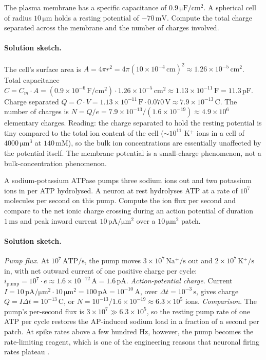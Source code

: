 \begin{exercise}
The plasma membrane has a specific capacitance of $0.9\,\si{\micro\farad}/
\text{cm}^2$. A spherical cell of radius $10\,\si{\micro\meter}$
holds a resting potential of $-70\,\text{mV}$. Compute the total
charge separated across the membrane and the number of charges
involved.
\end{exercise}

\paragraph{Solution sketch.}
The cell's surface area is
$A = 4\pi r^2 = 4\pi (10 \times 10^{-4}\,\text{cm})^2
\approx 1.26 \times 10^{-5}\,\text{cm}^2$.
Total capacitance
$C = C_m \cdot A = (0.9 \times 10^{-6}\,\text{F}/\text{cm}^2)
\cdot 1.26 \times 10^{-5}\,\text{cm}^2
\approx 1.13 \times 10^{-11}\,\text{F} = 11.3\,\text{pF}$.
Charge separated $Q = C \cdot V
= 1.13 \times 10^{-11}\,\text{F} \cdot 0.070\,\text{V}
\approx 7.9 \times 10^{-13}\,\text{C}$. The number of charges is
$N = Q/e = 7.9 \times 10^{-13} / (1.6 \times 10^{-19})
\approx 4.9 \times 10^6$ elementary charges. Reading: the charge
separated to hold the resting potential is tiny compared to the
total ion content of the cell ($\sim 10^{11}$ K$^+$ ions in a
cell of $4000\,\si{\micro\meter}^3$ at $140\,\text{mM}$), so the bulk
ion concentrations are essentially unaffected by the potential
itself. The membrane potential is a small-charge phenomenon, not a
bulk-concentration phenomenon.

\begin{exercise}
A sodium-potassium ATPase pumps three sodium ions out and two
potassium ions in per ATP hydrolysed. A neuron at rest hydrolyses
ATP at a rate of $10^7$ molecules per second on this pump. Compute
the ion flux per second and compare to the net ionic charge
crossing during an action potential of duration $1\,\text{ms}$ and
peak inward current $10\,\text{pA}/\si{\micro\meter}^2$ over a
$10\,\si{\micro\meter}^2$ patch.
\end{exercise}

\paragraph{Solution sketch.}
\emph{Pump flux.} At $10^7\,\text{ATP/s}$, the pump moves
$3 \times 10^7\,\text{Na$^+$/s}$ out and $2 \times 10^7\,\text{K$^+$/s}$
in, with net outward current of one positive charge per cycle:
$i_{\text{pump}} = 10^7 \cdot e
\approx 1.6 \times 10^{-12}\,\text{A} = 1.6\,\text{pA}$.
\emph{Action-potential charge.} Current
$I = 10\,\text{pA}/\si{\micro\meter}^2 \cdot 10\,\si{\micro\meter}^2
= 100\,\text{pA} = 10^{-10}\,\text{A}$, over $\Delta t = 10^{-3}\,\text{s}$,
gives charge $Q = I \Delta t = 10^{-13}\,\text{C}$, or
$N = 10^{-13}/1.6 \times 10^{-19} \approx 6.3 \times 10^5$ ions.
\emph{Comparison.} The pump's per-second flux is
$3 \times 10^7 \gg 6.3 \times 10^5$, so the resting pump rate of one
ATP per cycle restores the AP-induced sodium load in a fraction of a
second per patch. At spike rates above a few hundred Hz, however, the
pump becomes the rate-limiting reagent, which is one of the
engineering reasons that neuronal firing rates plateau
\cite{paper:v6c01-attwell-laughlin-2001}.

